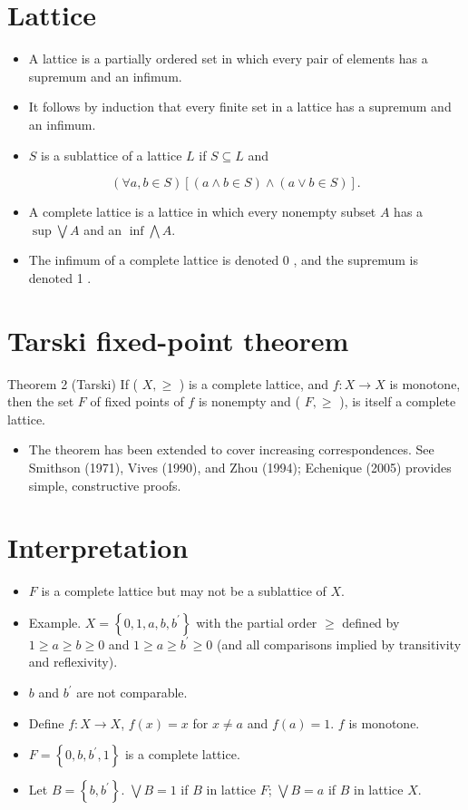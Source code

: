 \documentclass[10pt]{article}
\begin{document}
\section*{Lattice}
\begin{itemize}
  \item A lattice is a partially ordered set in which every pair of elements has a supremum and an infimum.
  \item It follows by induction that every finite set in a lattice has a supremum and an infimum.
  \item $S$ is a sublattice of a lattice $L$ if $S \subseteq L$ and
\end{itemize}

$$
(\forall a, b \in S)[(a \wedge b \in S) \wedge(a \vee b \in S)] .
$$

\begin{itemize}
  \item A complete lattice is a lattice in which every nonempty subset $A$ has a $\sup \bigvee A$ and an $\inf \bigwedge A$.
  \item The infimum of a complete lattice is denoted 0 , and the supremum is denoted 1 .
\end{itemize}

\section*{Tarski fixed-point theorem}
Theorem 2 (Tarski) If ( $X, \geq$ ) is a complete lattice, and $f: X \rightarrow X$ is monotone, then the set $F$ of fixed points of $f$ is nonempty and ( $F, \geq$ ), is itself a complete lattice.

\begin{itemize}
  \item The theorem has been extended to cover increasing correspondences. See Smithson (1971), Vives (1990), and Zhou (1994); Echenique (2005) provides simple, constructive proofs.
\end{itemize}

\section*{Interpretation}
\begin{itemize}
  \item $F$ is a complete lattice but may not be a sublattice of $X$.
  \item Example. $X=\left\{0,1, a, b, b^{\prime}\right\}$ with the partial order $\geq$ defined by $1 \geq a \geq b \geq 0$ and $1 \geq a \geq b^{\prime} \geq 0$ (and all comparisons implied by transitivity and reflexivity).
  \item $b$ and $b^{\prime}$ are not comparable.
  \item Define $f: X \rightarrow X$, $f(x)=x$ for $x \neq a$ and $f(a)=1$. $f$ is monotone.
  \item $F=\left\{0, b, b^{\prime}, 1\right\}$ is a complete lattice.
  \item Let $B=\left\{b, b^{\prime}\right\}$. $\bigvee B=1$ if $B$ in lattice $F$; $\bigvee B=a$ if $B$ in lattice $X$.
\end{itemize}
\end{document}
